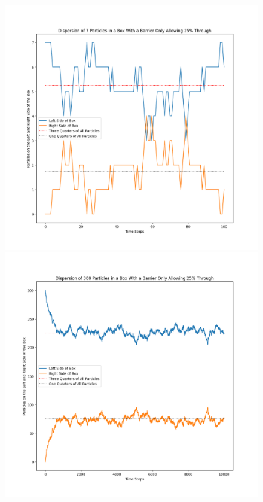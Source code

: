 \documentclass[12pt, A4]{article}
\begin{document}
\begin{figure}[h]
  \begin{center}
    \includegraphics[scale=0.35]{Task_4_Line_7}
    \includegraphics[scale=0.35]{Task_4_Line_300}

\end{center}
\end{figure}
\end{document}
